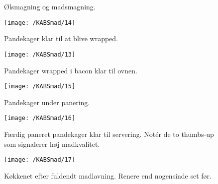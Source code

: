 \begin{figure}[h!]
\centering
{}
\caption{Ølsmagning og madsmagning.}
\label{fig:app2}
\end{figure}

\begin{figure}[h!]
\centering
\texttt{[image: /KABSmad/14]}
\caption{Pandekager klar til at blive wrapped.}
\end{figure}

\begin{figure}[h!]
\centering
\texttt{[image: /KABSmad/13]}
\caption{Pandekager wrapped i bacon klar til ovnen.}
\end{figure}

\begin{figure}[h!]
\centering
\texttt{[image: /KABSmad/15]}
\caption{Pandekager under panering.}
\end{figure}

\begin{figure}[h!]
\centering
\texttt{[image: /KABSmad/16]}
\caption{Færdig paneret pandekager klar til servering. Notér de to thumbs-up som signalerer høj madkvalitet.}
\end{figure}

\begin{figure}[h!]
\centering
\texttt{[image: /KABSmad/17]}
\caption{Køkkenet efter fuldendt madlavning. Renere end nogensinde set før.}
\end{figure}
